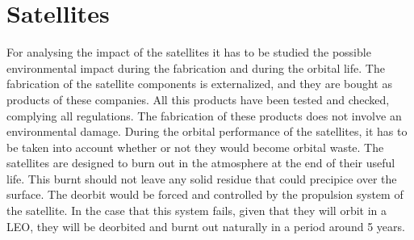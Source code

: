 \section{Satellites}
For analysing the impact of the satellites it has to be studied the possible environmental impact during the fabrication and during the orbital life.
The fabrication of the satellite components is externalized, and they are bought as products of these companies. All this products have been tested and checked, complying all regulations. The fabrication of these products does not involve an environmental damage. 
During the orbital performance of the satellites, it has to be taken into account whether or not they would become orbital waste. The satellites are designed to burn out in the atmosphere at the end of their useful life. This burnt should not leave any solid residue that could precipice over the surface. The deorbit would be forced and controlled by the propulsion system of the satellite. In the case that this system fails, given that they will orbit in a LEO, they will be deorbited and burnt out naturally in a period around 5 years.
